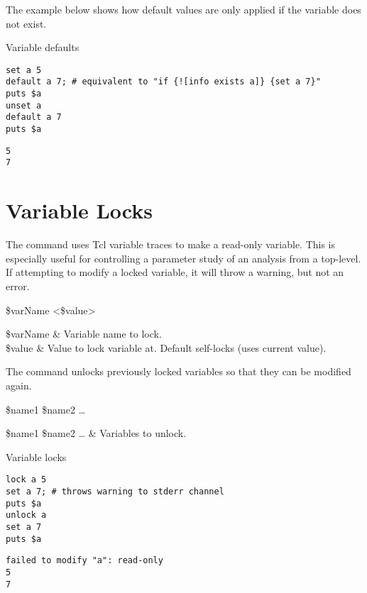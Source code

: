 \documentclass{article}
\begin{document}
The example below shows how default values are only applied if the variable does not exist.

\begin{example}{Variable defaults}
\begin{lstlisting}
set a 5
default a 7; # equivalent to "if {![info exists a]} {set a 7}"
puts $a
unset a
default a 7
puts $a
\end{lstlisting}
\tcblower
\begin{lstlisting}
5
7
\end{lstlisting}
\end{example}
\clearpage
\section{Variable Locks}
The command  uses Tcl variable traces to make a read-only variable. 
This is especially useful for controlling a parameter study of an analysis from a top-level.
If attempting to modify a locked variable, it will throw a warning, but not an error.

\begin{syntax}
 \$varName <\$value>
\end{syntax}
\begin{args}
\$varName & Variable name to lock. \\
\$value & Value to lock variable at. Default self-locks (uses current value).
\end{args}

The command  unlocks previously locked variables so that they can be modified again.

\begin{syntax}
 \$name1 \$name2 …
\end{syntax}
\begin{args}
\$name1 \$name2 … & Variables to unlock.
\end{args}

\begin{example}{Variable locks}
\begin{lstlisting}
lock a 5
set a 7; # throws warning to stderr channel
puts $a
unlock a
set a 7
puts $a
\end{lstlisting}
\tcblower
\begin{lstlisting}
failed to modify "a": read-only
5
7
\end{lstlisting}
\end{example}

\clearpage
\end{document}
